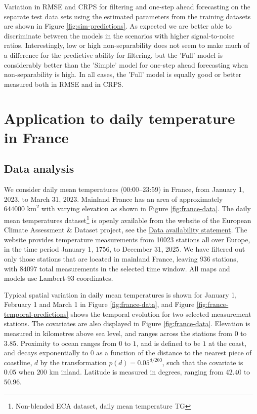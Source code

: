 \documentclass[12pt]{article} %
\begin{document}
Variation in RMSE and CRPS for filtering and one-step ahead forecasting on the separate test data sets using the estimated parameters from the training datasets are shown in Figure \ref{fig:sim-predictions}. As expected we are better able to discriminate between the models in the scenarios with higher signal-to-noise ratios. Interestingly, low or high non-separability does not seem to make much of a difference for the predictive ability for filtering, but the 'Full' model is considerably better than the 'Simple' model for one-step ahead forecasting when non-separability is high. In all cases, the 'Full' model is equally good or better measured both in RMSE and in CRPS.

\section{Application to daily temperature in France}\label{sec:application}
\subsection{Data analysis}
We consider daily mean temperatures (00:00--23:59) in France, from January 1, 2023, to March 31, 2023. Mainland France has an area of approximately $644000 \, \, \text{km}^2$ with varying elevation as shown in Figure \ref{fig:france-data}. The daily mean temperatures dataset\footnote{Non-blended ECA dataset, daily mean temperature TG} is openly available from the website of the European Climate Assessment \& Dataset project, see the \hyperref[sec:data-availability]{Data availability statement}. The website provides temperature measurements from 10023 stations all over Europe, in the time period January 1, 1756, to December 31, 2025. We have filtered out only those stations that are located in mainland France, leaving 936 stations, with $84097$ total measurements in the selected time window. All maps and models use Lambert-93 coordinates.

Typical spatial variation in daily mean temperatures is shown for January 1, February 1 and March 1 in Figure \ref{fig:france-data}, and Figure \ref{fig:france-temporal-predictions} shows the temporal evolution for two selected measurement stations. The covariates are also displayed in Figure \ref{fig:france-data}. Elevation is measured in kilometres above sea level, and ranges across the stations from $0$ to $3.85$. Proximity to ocean ranges from $0$ to $1$, and is defined to be $1$ at the coast, and decays exponentially to $0$ as a function of the distance to the nearest piece of coastline, $d$ by the transformation $p(d) = 0.05^{d/200}$, such that the covariate is $0.05$ when $200$ km inland. Latitude is measured in degrees, ranging from $42.40$ to $50.96$.
\end{document}

